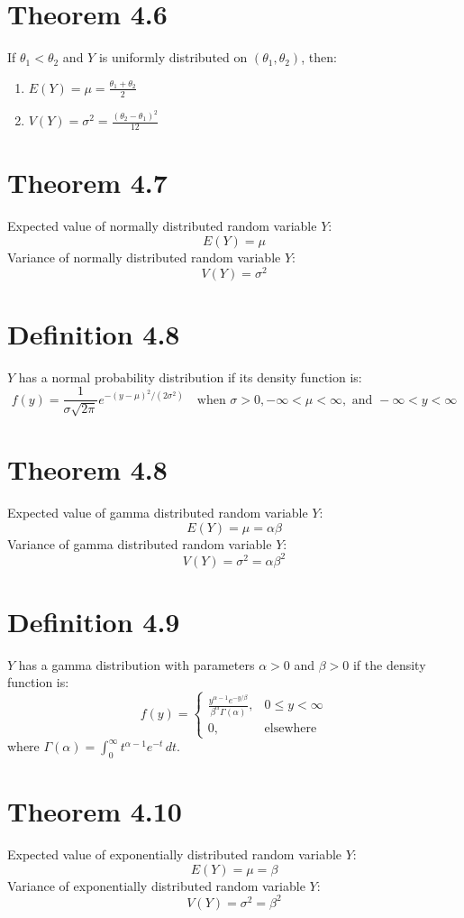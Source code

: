 \documentclass[12pt]{article}
\begin{document}
\section{Theorem 4.6}
If $\theta_1 < \theta_2$ and $Y$ is uniformly distributed on $(\theta_1, \theta_2)$, then:
\begin{enumerate}
  \item $E(Y) = \mu = \frac{\theta_1 + \theta_2}{2}$
  \item $V(Y) = \sigma^2 = \frac{(\theta_2 - \theta_1)^2}{12}$
\end{enumerate}


\section{Theorem 4.7}
Expected value of normally distributed random variable $Y$:
\[
E(Y) = \mu
\]
Variance of normally distributed random variable $Y$:
\[
V(Y) = \sigma^2
\]
\section{Definition 4.8}
$Y$ has a normal probability distribution if its density function is:
\[
f(y) = \frac{1}{\sigma\sqrt{2\pi}} e^{-(y-\mu)^2/(2\sigma^2)} \quad \text{when } \sigma > 0, -\infty < \mu < \infty, \text{ and } -\infty < y < \infty
\]

\section{Theorem 4.8}
Expected value of gamma distributed random variable $Y$:
\[
E(Y) = \mu = \alpha\beta
\]
Variance of gamma distributed random variable $Y$:
\[
V(Y) = \sigma^2 = \alpha\beta^2
\]

\section{Definition 4.9}
$Y$ has a gamma distribution with parameters $\alpha > 0$ and $\beta > 0$ if the density function is:
\[
f(y) = \begin{cases} \frac{y^{\alpha-1} e^{-y/\beta}}{\beta^\alpha \Gamma(\alpha)}, & 0 \leq y < \infty \\ 0, & \text{elsewhere} \end{cases}
\]
where $\Gamma(\alpha) = \int_0^{\infty} t^{\alpha-1} e^{-t}\,dt$.

\section{Theorem 4.10}
Expected value of exponentially distributed random variable $Y$:
\[
E(Y) = \mu = \beta
\]
Variance of exponentially distributed random variable $Y$:
\[
V(Y) = \sigma^2 = \beta^2
\]
\end{document}
